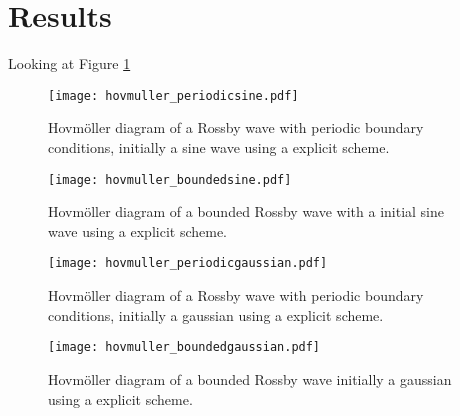 \section{Results}
\label{sec:results}

Looking at Figure \ref{fig:hovmollerSinePeriodic}
\begin{figure}[htbp]
	\centering
	\texttt{[image: hovmuller\_periodicsine.pdf]}
	\caption{Hovmöller diagram of a Rossby wave with periodic boundary conditions, initially a sine wave using a explicit scheme.}
	\label{fig:hovmollerSinePeriodic}
\end{figure}

\begin{figure}[htbp]
	\centering
	\texttt{[image: hovmuller\_boundedsine.pdf]}
	\caption{Hovmöller diagram of a bounded Rossby wave with a initial sine wave using a explicit scheme.}
	\label{fig:hovmollerSineBounded}
\end{figure}

\begin{figure}[htbp]
	\centering
	\texttt{[image: hovmuller\_periodicgaussian.pdf]}
	\caption{Hovmöller diagram of a Rossby wave with periodic boundary conditions, initially a gaussian using a explicit scheme.}
	\label{fig:hovmollerGaussianPeriodic}
\end{figure}

\begin{figure}[htbp]
	\centering
	\texttt{[image: hovmuller\_boundedgaussian.pdf]}
	\caption{Hovmöller diagram of a bounded Rossby wave initially a gaussian using a explicit scheme.}
	\label{fig:hovmollerGaussianBounded}
\end{figure}

